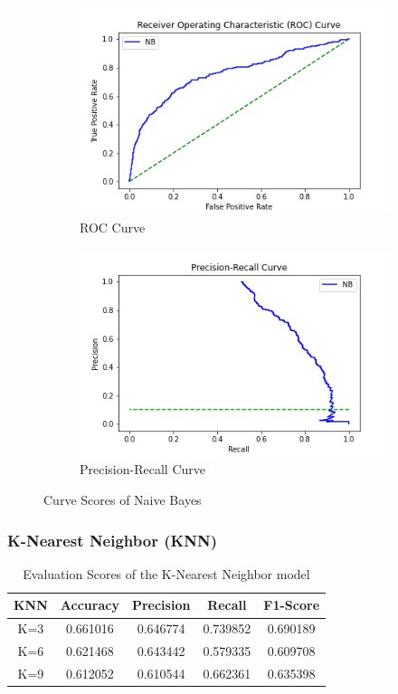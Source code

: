 \documentclass[11pt]{article}
\begin{document}
\begin{figure}[ht]
\begin{subfigure}{0.5\textwidth}
\includegraphics[scale=0.45]{roc_nb.png} 
\caption{ROC Curve}
\label{fig:rocNB}
\end{subfigure}
\begin{subfigure}{0.5\textwidth}
\includegraphics[scale=0.45]{prs_nb.png}
\caption{Precision-Recall Curve}
\label{fig:prsNB}
\end{subfigure}
\label{fig:csNB}
\caption{Curve Scores of Naive Bayes}
\end{figure}

\clearpage
\subsubsection{K-Nearest Neighbor (KNN)}
\begin{table}[ht]
\centering
\caption{\label{tab:knnMetrics}Evaluation Scores of the K-Nearest Neighbor model}
\begin{adjustbox}{width=0.7\textwidth}
\begin{tabular}{|c|c|c|c|c|}
\hline
\textbf{KNN} & \textbf{Accuracy} & \textbf{Precision} & \textbf{Recall} & \textbf{F1-Score} \\ \hline
K=3        & 0.661016          & 0.646774           & 0.739852        & 0.690189          \\ \hline
K=6        & 0.621468          & 0.643442           & 0.579335        & 0.609708          \\ \hline
K=9        & 0.612052          & 0.610544           & 0.662361        & 0.635398          \\ \hline
\end{tabular}
\end{adjustbox}
\end{table}
\end{document}
